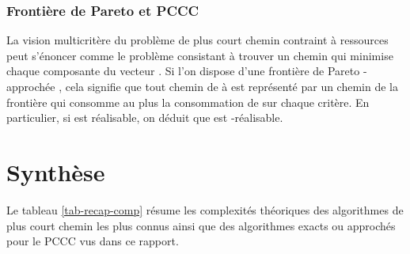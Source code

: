 \documentclass[10pt,francais]{llncs}
\begin{document}
{\subsubsection{Fronti\`ere de Pareto et PCCC}\label{subsub-approx-multiobj-p3c}
La vision multicrit\`ere du probl\`eme de plus court chemin contraint \`a  ressources peut s'\'enoncer comme le probl\`eme consistant \`a trouver un chemin  qui minimise chaque composante du vecteur . Si l'on dispose d'une fronti\`ere de Pareto -approch\'ee , cela signifie que tout chemin  de  \`a  est repr\'esent\'e par un chemin  de la fronti\`ere  qui consomme au plus  la consommation de  sur chaque crit\`ere. En particulier, si  est r\'ealisable, on d\'eduit que  est -r\'ealisable. 

\section{Synth\`ese}\label{sec-conc}

Le tableau \ref{tab-recap-comp} r\'esume les complexit\'es th\'eoriques des algorithmes de plus court chemin les plus connus ainsi que des algorithmes exacts ou approch\'es pour le PCCC vus dans ce rapport.
\begin{table}
\center


\end{table}}
\end{document}
